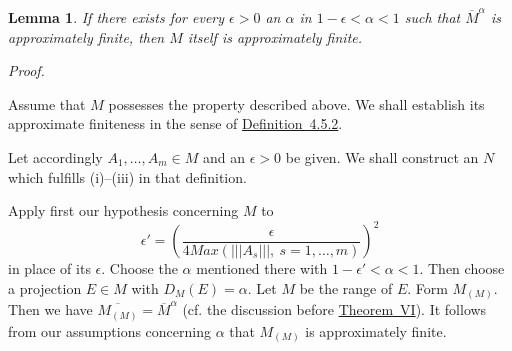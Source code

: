 \documentclass[b5paper,twoside]{article}
\newcommand{\thmref}[2]{\hyperref[#1]{\mbox{Theorem~#2}}}
\newcommand{\defref}[2]{\hyperref[#1]{\mbox{Definition~#2}}}
\theoremstyle{mvnplain}
\newtheorem{lemma}{Lemma}[section]
\renewenvironment{proof}[1][Proof]{%
  \par\addvspace{0.35\baselineskip}%
  \noindent\textit{#1.}\ \normalfont\ignorespaces
}{%
  \par\addvspace{0.35\baselineskip}%
}
\newcommand{\M}{\mathbf M}
\newcommand{\N}{\mathbf N}
\newcommand{\OpNorm}[1]{\left\lvert\left\lvert\left\lvert#1\right\rvert\right\rvert\right\rvert}
\def\M{M}%
\def\N{N}%
\def\operatorname#1{#1}%
\def\mathfrak#1{#1}%
\begin{document}
\begin{lemma}\label{lem:4.8.3}
If there exists for every \(\epsilon>0\) an \(\alpha\) in
\(1-\epsilon<\alpha<1\) such that \(\overline{\M}^{\alpha}\) is
approximately finite, then \(\M\) itself is approximately finite.
\end{lemma}

\begin{proof}
Assume that \(\M\) possesses the property described above. We shall establish
its approximate finiteness in the sense of \defref{def:4.5.2}{4.5.2}.

Let accordingly \(A_1,\ldots,A_m\in\M\) and an \(\epsilon>0\) be given. We
shall construct an \(\N\) which fulfills (i)--(iii) in that definition.

Apply first our hypothesis concerning \(\M\) to
\begin{equation}\tag{4.8.\(\eta\)}\label{eq:4.8-eta}
 \epsilon'=\left(
 \frac{\epsilon}{4\operatorname{Max}(\OpNorm{A_s},\ s=1,\ldots,m)}
 \right)^2
\end{equation}
in place of its \(\epsilon\). Choose the \(\alpha\) mentioned there with
\(1-\epsilon'<\alpha<1\). Then choose a projection \(E\in\M\) with
\(D_{\M}(E)=\alpha\). Let \(\mathfrak M\) be the range of \(E\). Form
\(\M_{(\mathfrak M)}\). Then we have
\(\overline{\M_{(\mathfrak M)}}=\overline{\M}^{\alpha}\) (cf. the discussion
before \thmref{thm:VI}{VI}). It follows from our assumptions concerning
\(\alpha\) that \(\M_{(\mathfrak M)}\) is approximately finite.


\end{proof}
\end{document}
